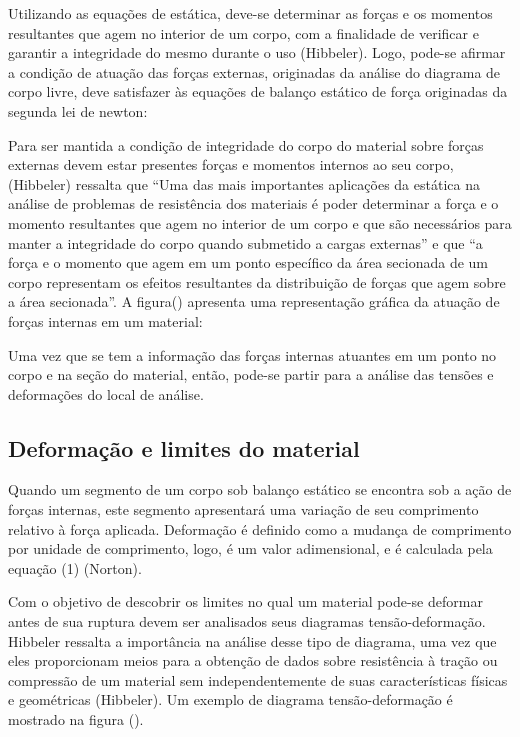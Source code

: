 Utilizando as equações de estática, deve-se determinar as forças e os momentos resultantes que agem no interior de um corpo, com a finalidade de verificar e garantir a integridade do mesmo durante o uso (Hibbeler). Logo, pode-se afirmar a condição de atuação das forças externas, originadas da análise do diagrama de corpo livre, deve satisfazer às equações de balanço estático de força originadas da segunda lei de newton:

Para ser mantida a condição de integridade do corpo do material sobre forças externas devem estar presentes forças e momentos internos ao seu corpo, (Hibbeler) ressalta que “Uma das mais importantes aplicações da estática na análise de problemas de resistência dos materiais é poder determinar a força e o momento resultantes que agem no interior de um corpo e que são necessários para manter a integridade do corpo quando submetido a cargas externas” e que “a força e o momento que agem em um ponto específico da área secionada de um corpo representam os efeitos resultantes da distribuição de forças que agem sobre a área secionada”. A figura() apresenta uma representação gráfica da atuação de forças internas em um material:

Uma vez que se tem a informação das forças internas atuantes em um ponto no corpo e na seção do material, então, pode-se partir para a análise das tensões e deformações do local de análise.

\subsection{Deformação e limites do material}

Quando um segmento de um corpo sob balanço estático se encontra sob a ação de forças internas, este segmento apresentará uma variação de seu comprimento relativo à força aplicada. Deformação é definido como a mudança de comprimento por unidade de comprimento, logo, é um valor adimensional, e é calculada pela equação (1) (Norton).

Com o objetivo de descobrir os limites no qual um material pode-se deformar antes de sua ruptura devem ser analisados seus diagramas tensão-deformação. Hibbeler ressalta a importância na análise desse tipo de diagrama, uma vez que eles proporcionam meios para a obtenção de dados sobre resistência à tração ou compressão de um material sem independentemente de suas características físicas e geométricas (Hibbeler). Um exemplo de diagrama tensão-deformação é mostrado na figura ().

